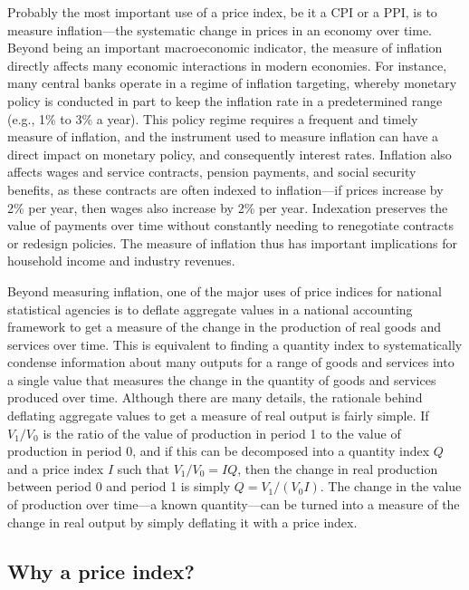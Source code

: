 \documentclass[]{article}
\begin{document}
Probably the most important use of a price index, be it a CPI or a PPI, is to measure inflation---the systematic change in prices in an economy over time. Beyond being an important macroeconomic indicator, the measure of inflation directly affects many economic interactions in modern economies. For instance, many central banks operate in a regime of inflation targeting, whereby monetary policy is conducted in part to keep the inflation rate in a predetermined range (e.g., 1\% to 3\% a year). This policy regime requires a frequent and timely measure of inflation, and the instrument used to measure inflation can have a direct impact on monetary policy, and consequently interest rates. Inflation also affects wages and service contracts, pension payments, and social security benefits, as these contracts are often indexed to inflation---if prices increase by 2\% per year, then wages also increase by 2\% per year. Indexation preserves the value of payments over time without constantly needing to renegotiate contracts or redesign policies. The measure of inflation thus has important implications for household income and industry revenues.

Beyond measuring inflation, one of the major uses of price indices for national statistical agencies is to deflate aggregate values in a national accounting framework to get a measure of the change in the production of real goods and services over time. This is equivalent to finding a quantity index to systematically condense information about many outputs for a range of goods and services into a single value that measures the change in the quantity of goods and services produced over time. Although there are many details, the rationale behind deflating aggregate values to get a measure of real output is fairly simple. If \(V_1/V_0\) is the ratio of the value of production in period 1 to the value of production in period 0, and if this can be decomposed into a quantity index \(Q\) and a price index \(I\) such that \(V_1/V_0 = IQ\), then the change in real production between period 0 and period 1 is simply \(Q = V_1 / (V_0 I)\). The change in the value of production over time---a known quantity---can be turned into a measure of the change in real output by simply deflating it with a price index.

\hypertarget{why-a-price-index}{%
\subsection{Why a price index?}\label{why-a-price-index}}
\end{document}

